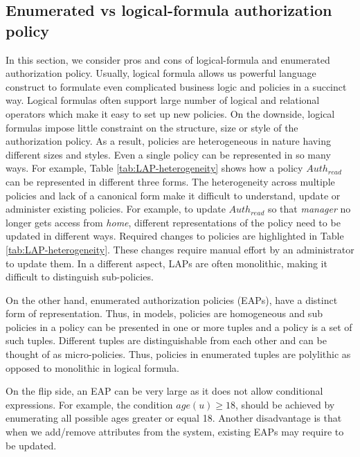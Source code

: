 \subsection{Enumerated vs logical-formula authorization policy}
In this section, we consider pros and cons of logical-formula and enumerated   authorization policy. Usually, logical formula   allows us powerful language construct to formulate even complicated business logic and policies in a succinct way. Logical formulas often support large number of logical and relational operators which make it easy to set up new policies. On the downside,  logical formulas impose little constraint on the structure, size or style of the authorization policy. As a result, policies are heterogeneous in nature having different sizes and styles. Even a single policy can be represented in so many ways.  For example, Table \ref{tab:LAP-heterogeneity} shows how a policy $Auth_{read}$ can  be represented in different three forms. The heterogeneity across multiple policies and lack of a canonical form make it difficult to understand, update or administer existing policies.  For example, to update $Auth_{read}$ so that \textit{manager} no longer gets access from \textit{home}, different representations of the policy need to be updated in different ways. Required changes to policies are highlighted in Table \ref{tab:LAP-heterogeneity}. These changes require  manual effort  by an administrator to update them. In a different aspect, LAPs are often monolithic, making it difficult to distinguish sub-policies.




On the other hand, enumerated authorization policies (EAPs), have a distinct form of representation. Thus, in \EPModels{} models, policies are homogeneous and  sub policies in a policy can be presented in one or more tuples and a  policy is a set of such tuples. Different tuples are distinguishable from each other and can be thought of as micro-policies. Thus, policies in enumerated tuples are polylithic as opposed to monolithic in logical formula. 


On the flip side, an EAP can be very large as it  does not allow conditional expressions. For example, the  condition \textit{$age(u) \ge 18$}, should be achieved by enumerating all possible ages greater or equal 18. Another disadvantage  is that when we add/remove attributes from the system, existing EAPs may require to be updated. 

